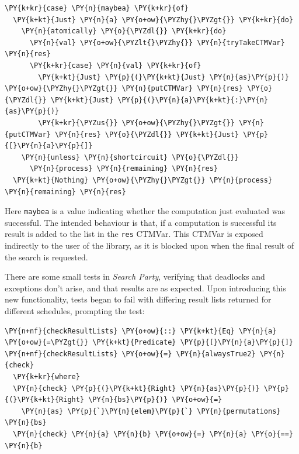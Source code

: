 
\begin{Verbatim}[commandchars=\\\{\}]
\PY{k+kr}{case} \PY{n}{maybea} \PY{k+kr}{of}
  \PY{k+kt}{Just} \PY{n}{a} \PY{o+ow}{\PYZhy{}\PYZgt{}} \PY{k+kr}{do}
    \PY{n}{atomically} \PY{o}{\PYZdl{}} \PY{k+kr}{do}
      \PY{n}{val} \PY{o+ow}{\PYZlt{}\PYZhy{}} \PY{n}{tryTakeCTMVar} \PY{n}{res}
      \PY{k+kr}{case} \PY{n}{val} \PY{k+kr}{of}
        \PY{k+kt}{Just} \PY{p}{(}\PY{k+kt}{Just} \PY{n}{as}\PY{p}{)} \PY{o+ow}{\PYZhy{}\PYZgt{}} \PY{n}{putCTMVar} \PY{n}{res} \PY{o}{\PYZdl{}} \PY{k+kt}{Just} \PY{p}{(}\PY{n}{a}\PY{k+kt}{:}\PY{n}{as}\PY{p}{)}
        \PY{k+kr}{\PYZus{}} \PY{o+ow}{\PYZhy{}\PYZgt{}} \PY{n}{putCTMVar} \PY{n}{res} \PY{o}{\PYZdl{}} \PY{k+kt}{Just} \PY{p}{[}\PY{n}{a}\PY{p}{]}
    \PY{n}{unless} \PY{n}{shortcircuit} \PY{o}{\PYZdl{}}
      \PY{n}{process} \PY{n}{remaining} \PY{n}{res}
  \PY{k+kt}{Nothing} \PY{o+ow}{\PYZhy{}\PYZgt{}} \PY{n}{process} \PY{n}{remaining} \PY{n}{res}
\end{Verbatim}

Here \texttt{maybea} is a value indicating whether the computation
just evaluated was successful. The intended behaviour is that, if a
computation is successful its result is added to the list in the
\texttt{res} CTMVar. This CTMVar is exposed indirectly to the user of
the library, as it is blocked upon when the final result of the search
is requested.

There are some small tests in \textit{Search Party}, verifying that
deadlocks and exceptions don't arise, and that results are as
expected. Upon introducing this new functionality, tests began to fail
with differing result lists returned for different schedules,
prompting the test:


\begin{Verbatim}[commandchars=\\\{\}]
\PY{n+nf}{checkResultLists} \PY{o+ow}{::} \PY{k+kt}{Eq} \PY{n}{a} \PY{o+ow}{=\PYZgt{}} \PY{k+kt}{Predicate} \PY{p}{[}\PY{n}{a}\PY{p}{]}
\PY{n+nf}{checkResultLists} \PY{o+ow}{=} \PY{n}{alwaysTrue2} \PY{n}{check}
  \PY{k+kr}{where}
  \PY{n}{check} \PY{p}{(}\PY{k+kt}{Right} \PY{n}{as}\PY{p}{)} \PY{p}{(}\PY{k+kt}{Right} \PY{n}{bs}\PY{p}{)} \PY{o+ow}{=}
    \PY{n}{as} \PY{p}{`}\PY{n}{elem}\PY{p}{`} \PY{n}{permutations} \PY{n}{bs}
  \PY{n}{check} \PY{n}{a} \PY{n}{b} \PY{o+ow}{=} \PY{n}{a} \PY{o}{==} \PY{n}{b}
\end{Verbatim}

